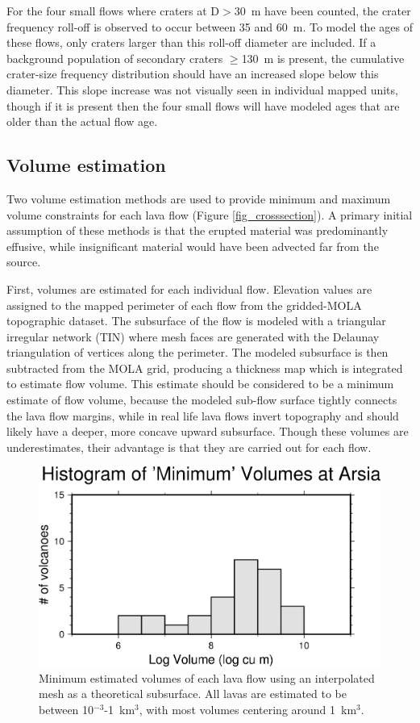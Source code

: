 \documentclass[12pt,letter]{article}
\begin{document}
For the four small flows where craters at D$>$30~m have been counted, the crater frequency roll-off is observed to occur between 35 and 60~m. To model the ages of these flows, only craters larger than this roll-off diameter are included. If a background population of secondary craters $\ge$130~m is present, the  cumulative crater-size frequency distribution should have an increased slope below this diameter. This slope increase was not visually seen in individual mapped units, though if it is present then the four small flows will have modeled ages that are older than the actual flow age. 

\subsection{Volume estimation}
Two volume estimation methods are used to provide minimum and maximum volume constraints for each lava flow (Figure \ref{fig_crosssection}). A primary initial assumption of these methods is that the erupted material was predominantly effusive, while insignificant material would have been advected far from the source.

First, volumes are estimated for each individual flow. Elevation values are assigned to the mapped perimeter of each flow from the gridded-MOLA topographic dataset. The subsurface of the flow is modeled with a triangular irregular network (TIN) where mesh faces are generated with the Delaunay triangulation of vertices along the perimeter. The modeled subsurface is then subtracted from the MOLA grid, producing a thickness map which is integrated to estimate flow volume. This estimate should be considered to be a minimum estimate of flow volume, because the modeled sub-flow surface tightly connects the lava flow margins, while in real life lava flows invert topography and should likely have a deeper, more concave upward subsurface. Though these volumes are underestimates, their advantage is that they are carried out for each flow.


\begin{figure}
\centering
\includegraphics[width=0.4\linewidth]{figures/volumehist.png}
\caption{Minimum estimated volumes of each lava flow using an interpolated mesh as a theoretical subsurface. All lavas are estimated to be between 10$^{-3}$-1~km$^3$, with most volumes centering around 1~km$^3$.}
\label{fig_volumehistogram}
\end{figure}
\end{document}
